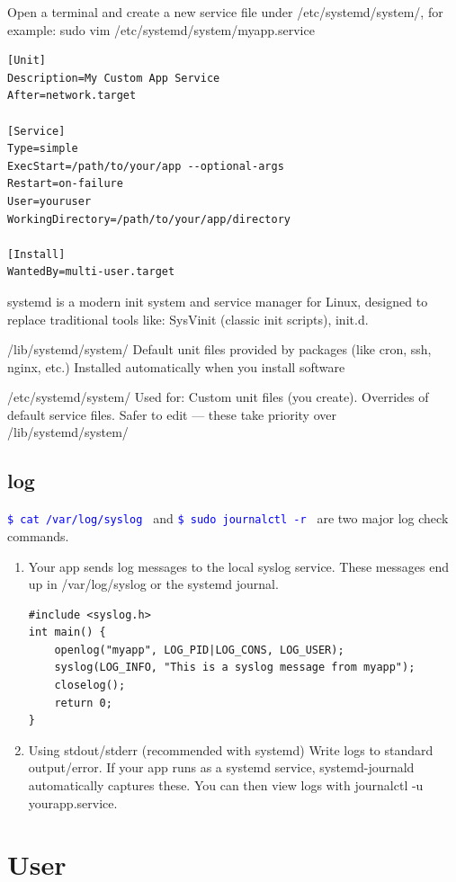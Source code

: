 \documentclass[paper=8.5in:11in, twoside, 12pt, pagesize=pdftex]{book}
\newcommand{\linuxcommand}[1]{\texttt{\textcolor{blue}{\$ #1 \Pisymbol{psy}{191}}}}
\begin{document}
Open a terminal and create a new service file under /etc/systemd/system/, for example:  sudo vim /etc/systemd/system/myapp.service
\begin{lstlisting}
[Unit]
Description=My Custom App Service
After=network.target

[Service]
Type=simple
ExecStart=/path/to/your/app --optional-args
Restart=on-failure
User=youruser
WorkingDirectory=/path/to/your/app/directory

[Install]
WantedBy=multi-user.target
\end{lstlisting}

systemd is a modern init system and service manager for Linux, designed to replace traditional tools like: SysVinit (classic init scripts), init.d.


/lib/systemd/system/  Default unit files provided by packages (like cron, ssh, nginx, etc.) Installed automatically when you install software

/etc/systemd/system/  Used for:
Custom unit files (you create). Overrides of default service files. Safer to edit — these take priority over /lib/systemd/system/

\subsection{log}

\linuxcommand{cat /var/log/syslog} and \linuxcommand{sudo journalctl -r}  are two major log check commands.
\begin{enumerate}
	\item Your app sends log messages to the local syslog service.
	These messages end up in /var/log/syslog or the systemd journal.

\begin{lstlisting}
#include <syslog.h>
int main() {
	openlog("myapp", LOG_PID|LOG_CONS, LOG_USER);
	syslog(LOG_INFO, "This is a syslog message from myapp");
	closelog();
	return 0;
}
\end{lstlisting}	

	
	\item Using stdout/stderr (recommended with systemd)
	Write logs to standard output/error. If your app runs as a systemd service, systemd-journald automatically captures these. You can then view logs with journalctl -u yourapp.service.
\end{enumerate}


\section{User}
\end{document}
